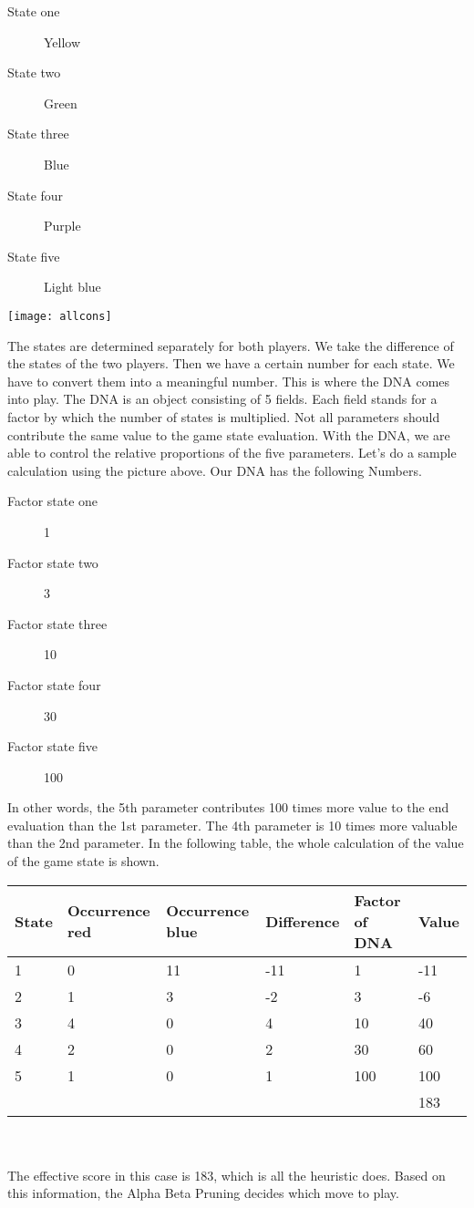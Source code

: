 \begin{description}
\item[State one] Yellow
\item[State two] Green
\item[State three] Blue
\item[State four] Purple
\item[State five] Light blue
\end{description}
\begin{fixedpic}
	\centering
	\texttt{[image: allcons]}
\end{fixedpic}
The states are determined separately for both players. We take the difference of the states of the two players. 
Then we have a certain number for each state. We have to convert them into a meaningful number. This is where the DNA comes into play. The DNA is an object consisting of 5 fields. Each field stands for a factor by which the number of states is multiplied. Not all parameters should contribute the same value to the game state evaluation. With the DNA, we are able to control the relative proportions of the five parameters. Let's do a sample calculation using the picture above. Our DNA has the following Numbers.\\ 
\begin{description}
\item[Factor state one] 1
\item[Factor state two] 3
\item[Factor state three] 10
\item[Factor state four] 30
\item[Factor state five] 100
\end{description}

In other words, the 5th parameter contributes 100 times more value to the end evaluation than the 1st parameter. The 4th parameter is 10 times more valuable than the 2nd parameter. In the following table, the whole calculation of the value of the game state is shown.

\begin{tabularx}{\textwidth}{|X|X|X|X|X|X|}
\hline
State & Occurrence red & Occurrence blue & Difference & Factor of DNA & Value \\\hline
1	& 0	& 11	& -11	& 1 	& -11 \\\hline
2	& 1	& 3 	& -2	& 3 	& -6 \\\hline
3	& 4	& 0 	& 4 	& 10	& 40 \\\hline
4	& 2	& 0 	& 2 	& 30	& 60 \\\hline
5	& 1	& 0 	& 1 	& 100	& 100 \\\hline
\multicolumn{5}{X|}{} & 183 \\\cline{6-6}
\end{tabularx}\\
\\
The effective score in this case is 183, which is all the heuristic does. 
Based on this information, the Alpha Beta Pruning decides which move to play.



